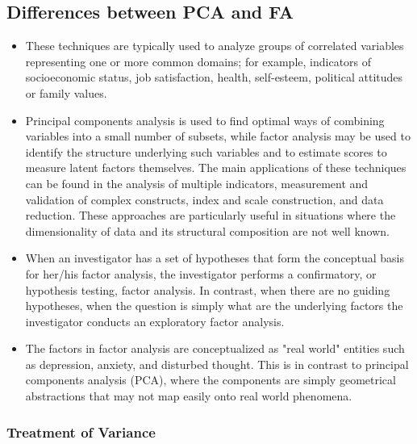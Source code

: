 \documentclass[a4paper,12pt]{article}
\begin{document}
\subsection{Differences between PCA and FA}
\begin{itemize}
	\item These techniques are typically used to analyze groups of correlated variables representing one or more common domains; for example, indicators of socioeconomic status, job satisfaction, health, self-esteem, political attitudes or family values. 
	\item	Principal components analysis is used to find optimal ways of combining variables into a small number of subsets, while factor analysis may be used to identify the structure underlying such variables and to estimate scores to measure latent factors themselves. The main applications of these techniques can be found in the analysis of multiple indicators, measurement and validation of complex constructs, index and scale construction, and data reduction. These approaches are particularly useful in situations where the dimensionality of data and its structural composition are not well known.
	
		\item When an investigator has a set of hypotheses that form the conceptual basis for her/his factor analysis, the investigator performs a confirmatory, or hypothesis testing, factor analysis. In contrast, when there are no guiding hypotheses, when the question is simply what are the underlying factors the investigator conducts an exploratory factor analysis. 
	
		\item The factors in factor analysis are conceptualized as "real world" entities such as depression, anxiety, and disturbed thought. This is in contrast to principal components analysis (PCA), where the components are simply geometrical abstractions that may not map easily onto real world phenomena.
\end{itemize}


\subsubsection{ Treatment of Variance}
\end{document}
